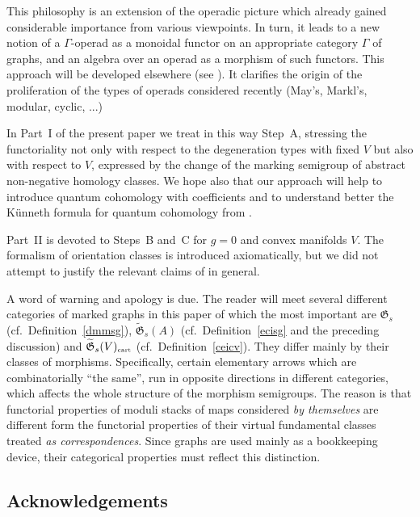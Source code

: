 \documentclass[11pt]{amsart}
\theoremstyle{definition}
\theoremstyle{remark}
\renewcommand{\tilde}{\widetilde}
\newcommand{\cart}{{\mbox{\tiny cart}}}
\newcommand{\GG}{{\mathfrak{G}}}
\theoremstyle{plain}
\theoremstyle{definition}
\theoremstyle{remark}
\begin{document}
\smallskip

This philosophy is an extension of the operadic picture which already gained
considerable importance from various
viewpoints.  In turn, it leads to a new notion of a \(\Gamma\)-operad as a
monoidal functor on an appropriate category
\(\Gamma\) of graphs, and an algebra over an operad as a morphism of such
functors.  This approach will be developed
elsewhere (see \cite{KapMan}). It clarifies the origin of the proliferation of
the types of operads considered recently
(May's, Markl's, modular, cyclic, ...)

\smallskip

In Part~I of the present paper we treat in this way Step~A, stressing the
functoriality not only with respect to the
degeneration types with fixed \(V\) but also with respect to \(V\), expressed by
the change of the marking semigroup of
abstract non-negative homology classes. We hope also that our approach will
help to introduce quantum cohomology with
coefficients and to understand better the K\"unneth formula for quantum
cohomology from \cite{KM2}.

\smallskip

Part~II is devoted to Steps~B and~C for \(g=0\) and convex manifolds \(V\). The
formalism of orientation classes is
introduced axiomatically, but we did not attempt to justify the relevant claims
of \cite{K} in general.

\smallskip

A word of warning and apology is due. The reader will meet several different
categories of marked graphs in this paper
of which the most important are \(\GG_s\) (cf.\ Definition~\ref{dmmsg}),
\(\tilde{\GG}_s(A)\) (cf.\ Definition~\ref{ecisg}
and the preceding discussion) and \(\tilde{\GG}_s(V)_{\cart}\) (cf.\
Definition~\ref{ceicv}). They differ mainly by their
classes of morphisms. Specifically, certain elementary arrows which are
combinatorially ``the same'', run in opposite
directions in different categories, which affects the whole structure of the
morphism semigroups. The reason is that
functorial properties of moduli stacks of maps considered {\em by themselves }
are different form the functorial
properties of their virtual fundamental classes treated {\em as
correspondences}. Since graphs are used mainly as a
bookkeeping device, their categorical properties must reflect this distinction.

\medskip

\subsection{Acknowledgements}
\end{document}
